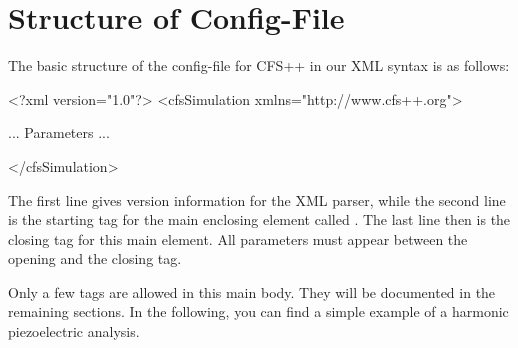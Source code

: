 \chapter{Structure of Config-File}
\label{sec:general}
%
%
The basic structure of the config-file for CFS++ in our XML
syntax is as follows:

\begin{xmllisting}
<?xml version="1.0"?>
<cfsSimulation xmlns="http://www.cfs++.org">

 ... Parameters ...

</cfsSimulation>
\end{xmllisting}

The first line gives version information for the XML parser, while the
second line is the starting tag for the main enclosing element called
.  The last line then is the closing tag for this main
element. All parameters must appear between the opening and the
closing tag.

Only a few tags are allowed in this main body. They will be documented in the
remaining sections. In the following, you can find a simple example of
a harmonic piezoelectric analysis.
%
%

